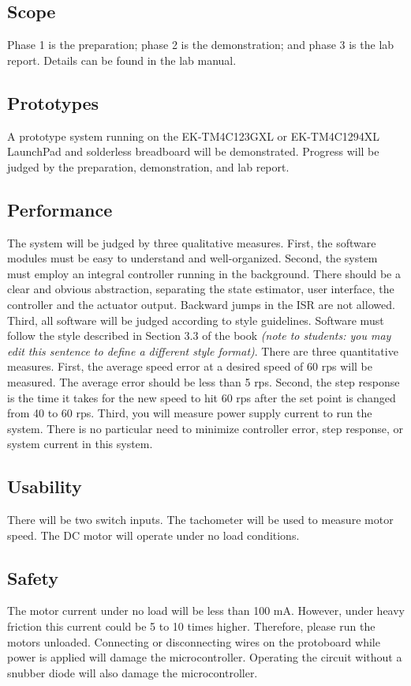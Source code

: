 \documentclass{article}
\begin{document}
	\subsection{Scope}
		Phase 1 is the preparation; phase 2 is the demonstration; and phase 3 is the lab report. Details can be found in the lab manual.
	\subsection{Prototypes}
		A prototype system running on the EK-TM4C123GXL or EK-TM4C1294XL LaunchPad and solderless breadboard will be demonstrated. Progress will be judged by the preparation, demonstration, and lab report.
	\subsection{Performance}
		The system will be judged by three qualitative measures. First, the software modules must be easy to understand and well-organized. Second, the system must employ an integral controller running in the background. There should be a clear and obvious abstraction, separating the state estimator, user interface, the controller and the actuator output. Backward jumps in the ISR are not allowed. Third, all software will be judged according to style guidelines. Software must follow the style described in Section 3.3 of the book \textit{(note to students: you may edit this sentence to define a different style format)}. There are three quantitative measures. First, the average speed error at a desired speed of 60 rps will be measured. The average error should be less than 5 rps. Second, the step response is the time it takes for the new speed to hit 60 rps after the set point is changed from 40 to 60 rps. Third, you will measure power supply current to run the system. There is no particular need to minimize controller error, step response, or system current in this system.
	\subsection{Usability}
		There will be two switch inputs. The tachometer will be used to measure motor speed. The DC motor will operate under no load conditions.
	\subsection{Safety}
		The motor current under no load will be less than 100 mA. However, under heavy friction this current could be 5 to 10 times higher. Therefore, please run the motors unloaded. Connecting or disconnecting wires on the protoboard while power is applied will damage the microcontroller. Operating the circuit without a snubber diode will also damage the microcontroller. 
\end{document}
